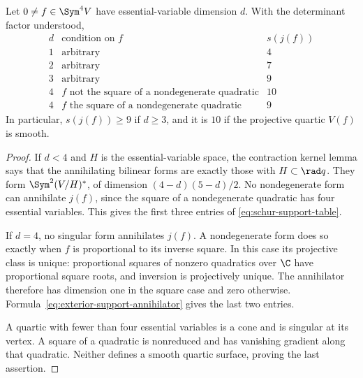 \begin{proposition}
\label{prop:exact-schur-support}
Let \(0\ne f\in\Sym^4V\) have essential-variable dimension
\(d\).  With the determinant factor understood,
\begin{equation}\label{eq:schur-support-table}
\begin{array}{c|l|c}
 d&\text{condition on }f&s(j(f))\\ \hline
 1&\text{arbitrary}&4\\
 2&\text{arbitrary}&7\\
 3&\text{arbitrary}&9\\
 4&f\text{ not the square of a nondegenerate quadratic}&10\\
 4&f\text{ the square of a nondegenerate quadratic}&9
\end{array}
\end{equation}
In particular, \(s(j(f))\ge9\) if \(d\ge3\), and it is
\(10\) if the projective quartic \(V(f)\) is smooth.
\end{proposition}
\begin{proof}
If \(d<4\) and \(H\) is the essential-variable space, the
contraction kernel lemma says that the annihilating bilinear forms
are exactly those with \(H\subset\rad q\).  They form
\(\Sym^2(V/H)^*\), of dimension \((4-d)(5-d)/2\).
No nondegenerate form can annihilate \(j(f)\), since the square
of a nondegenerate quadratic has four essential variables.
This gives the first three entries of
\eqref{eq:schur-support-table}.

If \(d=4\), no singular form annihilates \(j(f)\).  A
nondegenerate form does so exactly when \(f\) is proportional
to its inverse square.  In this case its projective class is unique:
proportional squares of nonzero quadratics over \(\C\) have
proportional square roots, and inversion is projectively unique.
The annihilator therefore has dimension one in the square case and
zero otherwise.  Formula~\eqref{eq:exterior-support-annihilator}
gives the last two entries.

A quartic with fewer than four essential variables is a cone and is
singular at its vertex.  A square of a quadratic is nonreduced and
has vanishing gradient along that quadratic.  Neither defines a
smooth quartic surface, proving the last assertion.
\end{proof}

